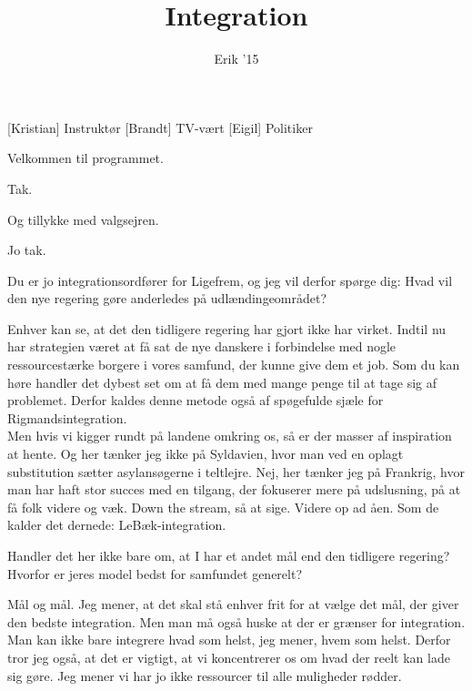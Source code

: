 \documentclass[a4paper,11pt]{article}
\title{Integration}
\author{Erik '15}
\begin{document}
\maketitle

\begin{roles}
[Kristian] Instruktør
[Brandt] TV-vært
[Eigil] Politiker
\end{roles}


\begin{sketch}

 Velkommen til programmet.

 Tak.

 Og tillykke med valgsejren.

 Jo tak.

 Du er jo integrationsordfører for Ligefrem, og jeg vil derfor spørge dig: Hvad vil den nye regering gøre anderledes på udlændingeområdet?

 Enhver kan se, at det den tidligere regering har gjort ikke har virket. Indtil nu har strategien været at få sat de nye danskere i forbindelse med nogle ressourcestærke borgere i vores samfund, der kunne give dem et job. Som du kan høre handler det dybest set om at få dem med mange penge til at tage sig af problemet. Derfor kaldes denne metode også af spøgefulde sjæle for Rigmandsintegration. \\
\noindent Men hvis vi kigger rundt på landene omkring os, så er der masser af inspiration at hente. Og her tænker jeg ikke på Syldavien, hvor man ved en oplagt substitution sætter asylansøgerne i teltlejre. Nej, her tænker jeg på Frankrig, hvor man har haft stor succes med en tilgang, der fokuserer mere på udslusning, på at få folk videre og væk. Down the stream, så at sige. Videre op ad åen. Som de kalder det dernede: LeBæk-integration.

 Handler det her ikke bare om, at I har et andet mål end den tidligere regering? Hvorfor er jeres model bedst for samfundet generelt?

 Mål og mål. Jeg mener, at det skal stå enhver frit for at vælge det mål, der giver den bedste integration.  Men man må også huske at der er grænser for integration. Man kan ikke bare integrere hvad som helst,  jeg mener, hvem som helst. Derfor tror jeg også, at det er vigtigt, at vi koncentrerer os om hvad der reelt kan lade sig gøre. Jeg mener vi har jo ikke ressourcer til alle muligheder rødder.


\end{sketch}
\end{document}
